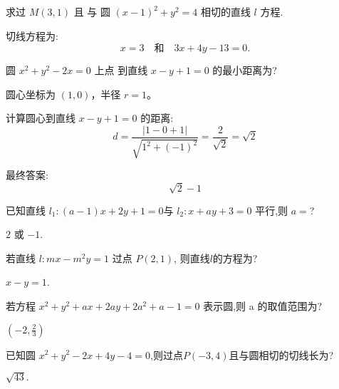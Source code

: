 \documentclass[aspectratio=169]{ctexbeamer}
\begin{document}
\begin{frame}{}{}
    求过 $M(3,1)$ 且 与 圆 $(x-1)^2 +y ^2 = 4$ 相切的直线 $l$ 方程.

    \pause
    切线方程为:
    \[
    \boxed{x=3} \quad \text{和} \quad \boxed{3x +4y -13 =0}.
    \]
\end{frame}
\begin{frame}{}{}
    圆 $x^2 + y^2 -2x = 0$ 上点 到直线 $x - y +1 = 0$ 的最小距离为?

    \pause 
    圆心坐标为 $(1,0)$，半径 $r=1$。

    计算圆心到直线 $x - y +1 = 0$ 的距离:
\[
d = \frac{|1 -0 +1|}{\sqrt{1^2 + (-1)^2}} = \frac{2}{\sqrt{2}} = \sqrt{2}
\]

最终答案:
\[
\boxed{\sqrt{2} -1}
\]

\end{frame}

\begin{frame}{}{}
    已知直线 $l_1 : (a-1) x + 2 y +1 = 0 $与 $l_2 :x+ay+3 = 0$ 平行,则 $a = $?

    \pause 

    $2$ 或 $-1$.
\end{frame}

\begin{frame}{}{}
    若直线 $l:mx - m^2 y = 1$ 过点 $P(2,1)$, 则直线$l$的方程为?

    \pause 

    $x-y =1$.
\end{frame}

\begin{frame}{}{}
    若方程 $x^2 +y^2 + ax + 2 ay +2a^2 +a -1 =0$ 表示圆,则 a 的取值范围为?

    \pause

    $(-2,\frac{2}{3})$
\end{frame}
\begin{frame}{}{}
    已知圆 $x^2 +y^2 - 2x +4y -4 = 0$,则过点$P(-3,4)$且与圆相切的切线长为?

    \pause
    $\sqrt{43}.$
\end{frame}





% 

% 
% 
% 



\end{document}
